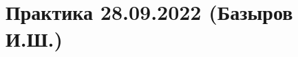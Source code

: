 \documentclass[main.tex]{subfiles}
\begin{document}

\section{Практика 28.09.2022 (Базыров И.Ш.)}
\end{document}
